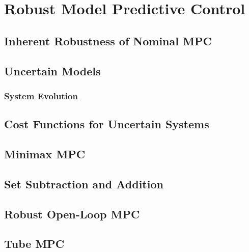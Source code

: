 \chapter{Robust Model Predictive Control} %
	\label{c:mpcRobust}


	\section{Inherent Robustness of Nominal MPC} %
		\label{sec:inherentRobustness}


	\section{Uncertain Models} %

		\subsection{System Evolution} %

	\section{Cost Functions for Uncertain Systems} %

	\section{Minimax MPC} %

	\section{Set Subtraction and Addition} %

	\section{Robust Open-Loop MPC} %

	\section{Tube MPC} %


